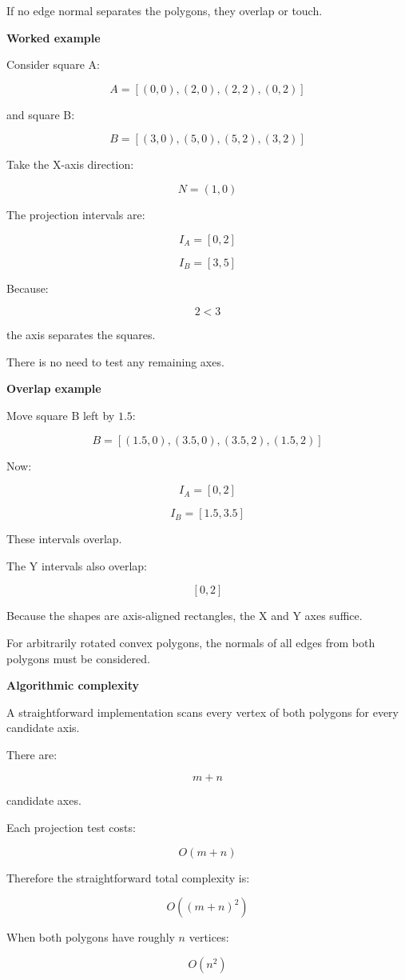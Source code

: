 If no edge normal separates the polygons, they overlap or touch.

\textbf{Worked example}

Consider square A:

\[
A=[(0,0),(2,0),(2,2),(0,2)]
\]

and square B:

\[
B=[(3,0),(5,0),(5,2),(3,2)]
\]

Take the X-axis direction:

\[
N=(1,0)
\]

The projection intervals are:

\[
I_A=[0,2]
\]

\[
I_B=[3,5]
\]

Because:

\[
2<3
\]

the axis separates the squares.

There is no need to test any remaining axes.

\textbf{Overlap example}

Move square B left by \(1.5\):

\[
B=[(1.5,0),(3.5,0),(3.5,2),(1.5,2)]
\]

Now:

\[
I_A=[0,2]
\]

\[
I_B=[1.5,3.5]
\]

These intervals overlap.

The Y intervals also overlap:

\[
[0,2]
\]

Because the shapes are axis-aligned rectangles, the X and Y axes suffice.

For arbitrarily rotated convex polygons, the normals of all edges from both polygons must be considered.

\textbf{Algorithmic complexity}

A straightforward implementation scans every vertex of both polygons for every candidate axis.

There are:

\[
m+n
\]

candidate axes.

Each projection test costs:

\[
O(m+n)
\]

Therefore the straightforward total complexity is:

\[
\boxed{ O((m+n)^2) }
\]

When both polygons have roughly \(n\) vertices:

\[
O(n^2)
\]

